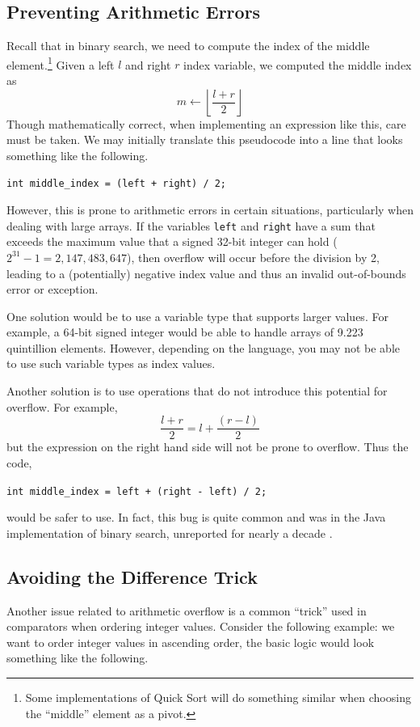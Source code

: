 \subsection{Preventing Arithmetic Errors}

Recall that in binary search, we need to compute the index of the middle 
element.\footnote{Some implementations of Quick Sort will do something 
similar when choosing the ``middle'' element as a pivot.}  Given a left 
$l$ and right $r$ index variable, we computed the middle index as
  $$m \leftarrow \left\lfloor \frac{l + r}{2} \right\rfloor$$
Though mathematically correct, when implementing an expression like this, 
care must be taken.  We may initially translate this pseudocode into a line
that looks something like the following.
  
\texttt{int middle_index = (left + right) / 2;}

However, this is prone to arithmetic errors in certain situations, particularly
when dealing with large arrays.  If the variables \texttt{left} 
and \texttt{right} have a sum that exceeds the maximum value that 
a signed 32-bit integer can hold ($2^{31} - 1 = 2,147,483,647$), then 
overflow will occur before the division by 2, leading to a (potentially) 
negative index value and thus an invalid out-of-bounds error or exception.

One solution would be to use a variable type that supports larger
values.  For example, a 64-bit signed integer would be able to handle
arrays of 9.223 quintillion elements.  However, depending on the language, 
you may not be able to use such variable types as index values.

Another solution is to use operations that do not introduce this 
potential for overflow.  For example, 
  $$\frac{l + r}{2} = l + \frac{(r - l)}{2}$$
but the expression on the right hand side will not be prone to overflow.  
Thus the code,

\texttt{int middle_index = left + (right - left) / 2;}

would be safer to use.  In fact, this bug is quite common 
\cite{Pattis:1988:TEB:52964.53012} and was in the Java implementation
of binary search, unreported for nearly a decade \cite{Bloch2006}.

\subsection{Avoiding the Difference Trick}

Another issue related to arithmetic overflow is a common ``trick'' 
used in comparators when ordering integer values.  Consider the following
example: we want to order integer values in ascending order, the basic
logic would look something like the following.

